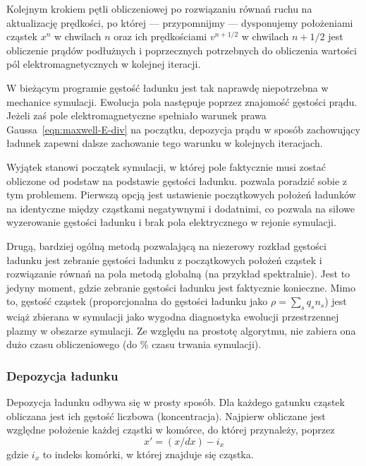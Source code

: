 Kolejnym krokiem pętli obliczeniowej po rozwiązaniu równań ruchu na
aktualizację prędkości, po której --- przypomnijmy --- dysponujemy położeniami
cząstek $x^n$ w chwilach $n$ oraz ich prędkościami $v^{n+1/2}$ w chwilach
$n+1/2$  jest obliczenie prądów podłużnych i
poprzecznych potrzebnych do obliczenia wartości pól elektromagnetycznych w
kolejnej iteracji.

W bieżącym programie gęstość ładunku jest tak naprawdę niepotrzebna w
mechanice symulacji. Ewolucja pola następuje poprzez znajomość gęstości prądu.
Jeżeli zaś pole elektromagnetyczne spełniało warunek
prawa Gaussa~\ref{eqn:maxwell-E-div} na początku, depozycja prądu w sposób
zachowujący ładunek zapewni dalsze zachowanie tego warunku w kolejnych
iteracjach.~\cite{bunemanvillasenor}

Wyjątek stanowi początek symulacji, w której pole faktycznie musi zostać
obliczone od podstaw na podstawie gęstości ładunku. \pythonpic{} pozwala
poradzić sobie z tym problemem. Pierwszą opcją jest ustawienie początkowych
położeń ładunków na identyczne między cząstkami negatywnymi i dodatnimi, co
pozwala na siłowe wyzerowanie gęstości ładunku i brak pola elektrycznego w
rejonie symulacji.

Drugą, bardziej ogólną metodą pozwalającą na niezerowy rozkład gęstości
ładunku jest zebranie gęstości ładunku z początkowych położeń cząstek i
rozwiązanie równań na pola metodą globalną (na przykład spektralnie). Jest
to jedyny moment, gdzie zebranie gęstości ładunku jest faktycznie konieczne.
Mimo to, gęstość cząstek (proporcjonalna do gęstości ładunku jako $\rho =
\sum_s q_s n_s$) jest wciąż zbierana w symulacji jako wygodna diagnostyka
ewolucji przestrzennej plazmy w obszarze symulacji. Ze względu na prostotę
algorytmu, nie zabiera ona dużo czasu obliczeniowego (do
\% czasu trwania symulacji).

\subsubsection{Depozycja ładunku}

 Depozycja ładunku odbywa się w prosty sposób. Dla każdego gatunku
cząstek obliczana jest ich gęstość liczbowa (koncentracja). Najpierw
obliczane jest względne położenie każdej cząstki w komórce, do której
przynależy, poprzez
\begin{equation}
x' = (x/dx) - i_x
\label{eqn:relative-position}
\end{equation}
gdzie $i_x$ to indeks komórki, w której znajduje się cząstka.

